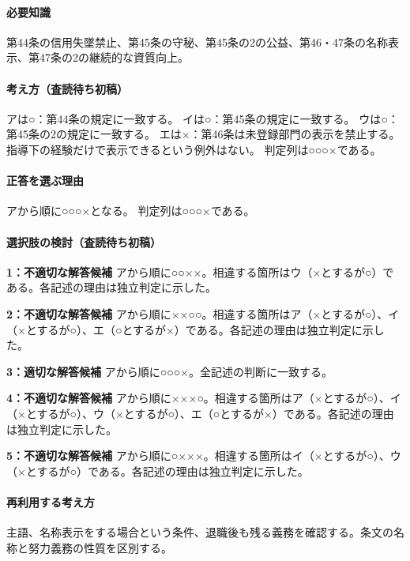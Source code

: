 \paragraph{必要知識} 第44条の信用失墜禁止、第45条の守秘、第45条の2の公益、第46・47条の名称表示、第47条の2の継続的な資質向上。

\paragraph{考え方（査読待ち初稿）} アは○：第44条の規定に一致する。 イは○：第45条の規定に一致する。 ウは○：第45条の2の規定に一致する。 エは×：第46条は未登録部門の表示を禁止する。指導下の経験だけで表示できるという例外はない。 判定列は○○○×である。

\paragraph{正答を選ぶ理由} アから順に○○○×となる。  判定列は○○○×である。

\paragraph{選択肢の検討（査読待ち初稿）}\mbox{}\par

\noindent\textbf{1：不適切な解答候補} アから順に○○××。相違する箇所はウ（×とするが○）である。各記述の理由は独立判定に示した。\par

\noindent\textbf{2：不適切な解答候補} アから順に××○○。相違する箇所はア（×とするが○）、イ（×とするが○）、エ（○とするが×）である。各記述の理由は独立判定に示した。\par

\noindent\textbf{3：適切な解答候補} アから順に○○○×。全記述の判断に一致する。\par

\noindent\textbf{4：不適切な解答候補} アから順に×××○。相違する箇所はア（×とするが○）、イ（×とするが○）、ウ（×とするが○）、エ（○とするが×）である。各記述の理由は独立判定に示した。\par

\noindent\textbf{5：不適切な解答候補} アから順に○×××。相違する箇所はイ（×とするが○）、ウ（×とするが○）である。各記述の理由は独立判定に示した。\par

\paragraph{再利用する考え方} 主語、名称表示をする場合という条件、退職後も残る義務を確認する。条文の名称と努力義務の性質を区別する。


